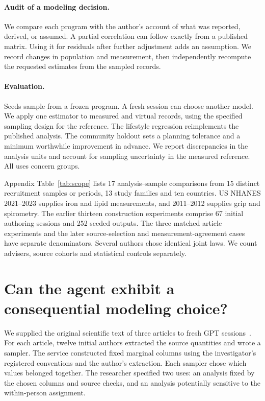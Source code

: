 \documentclass[sigconf,anonymous,review]{acmart}
\begin{document}
\paragraph{Audit of a modeling decision.}
We compare each program with the author's account of what was reported, derived, or assumed. A partial correlation can follow exactly from a published matrix. Using it for residuals after further adjustment adds an assumption. We record changes in population and measurement, then independently recompute the requested estimates from the sampled records.

\paragraph{Evaluation.}
Seeds sample from a frozen program. A fresh session can choose another model. We apply one estimator to measured and virtual records, using the specified sampling design for the reference. The lifestyle regression reimplements the published analysis. The community holdout sets a planning tolerance and a minimum worthwhile improvement in advance. We report discrepancies in the analysis units and account for sampling uncertainty in the measured reference. All uses concern groups.

Appendix Table~\ref{tab:scope} lists 17 analysis--sample comparisons from 15 distinct recruitment samples or periods, 13 study families and ten countries. US NHANES 2021--2023 supplies iron and lipid measurements, and 2011--2012 supplies grip and spirometry. The earlier thirteen construction experiments comprise 67 initial authoring sessions and 252 seeded outputs. The three matched article experiments and the later source-selection and measurement-agreement cases have separate denominators. Several authors chose identical joint laws. We count advisers, source cohorts and statistical controls separately.

\section{Can the agent exhibit a consequential modeling choice?}
\label{sec:matched}
We supplied the original scientific text of three articles to fresh GPT sessions~\cite{kavishe,polishspi,zhu}. For each article, twelve initial authors extracted the source quantities and wrote a sampler. The service constructed fixed marginal columns using the investigator's registered conventions and the author's extraction. Each sampler chose which values belonged together. The researcher specified two uses: an analysis fixed by the chosen columns and source checks, and an analysis potentially sensitive to the within-person assignment.
\end{document}
